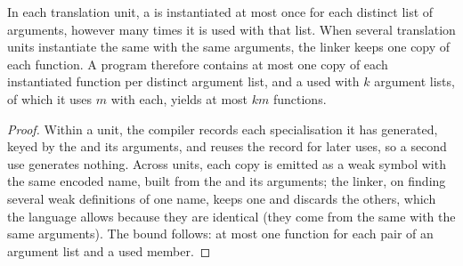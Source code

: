 \begin{proposition}\label{prop:b2:cpp-templates:instantiations}
In each translation unit, a  is instantiated at most once for each distinct list of  arguments,
however many times it is used with that list. When several translation units instantiate the same  with
the same arguments, the linker keeps one copy of each function. A program therefore contains at most one copy of
each instantiated function per distinct argument list, and a  used with $k$ argument lists, of which it
uses $m$  with each, yields at most $km$ functions.
\end{proposition}

\begin{proof}
Within a unit, the compiler records each specialisation it has generated, keyed by the  and its arguments,
and reuses the record for later uses, so a second use generates nothing. Across units, each copy is emitted as a weak
symbol with the same encoded name, built from the  and its arguments; the linker, on finding several weak
definitions of one name, keeps one and discards the others, which the language allows because they are identical
(they come from the same  with the same arguments). The bound follows: at most one function for each pair of
an argument list and a used member.
\end{proof}

